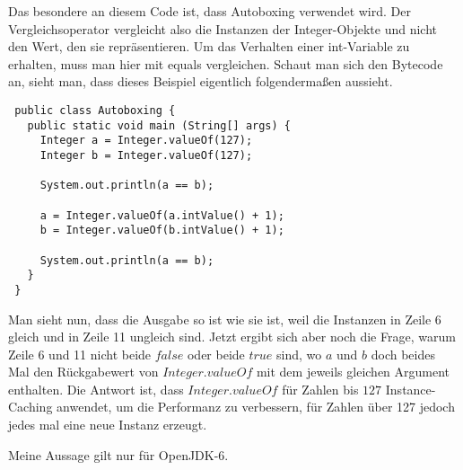\documentclass[a4paper,10pt]{article}
\begin{document}
Das besondere an diesem Code ist, dass Autoboxing verwendet wird.
Der Vergleichsoperator vergleicht also die Instanzen der Integer-Objekte und nicht den Wert, den sie repräsentieren.
Um das Verhalten einer int-Variable zu erhalten, muss man hier mit equals vergleichen.
Schaut man sich den Bytecode an, sieht man, dass dieses Beispiel eigentlich folgendermaßen aussieht.
\begin{lstlisting}
 public class Autoboxing {
   public static void main (String[] args) {
     Integer a = Integer.valueOf(127);
     Integer b = Integer.valueOf(127);

     System.out.println(a == b);

     a = Integer.valueOf(a.intValue() + 1);
     b = Integer.valueOf(b.intValue() + 1);

     System.out.println(a == b);
   }
 }
\end{lstlisting}
Man sieht nun, dass die Ausgabe so ist wie sie ist, weil die Instanzen in Zeile 6 gleich und in Zeile 11 ungleich sind.
Jetzt ergibt sich aber noch die Frage, warum Zeile 6 und 11 nicht beide $false$ oder beide $true$ sind, wo $a$ und $b$ doch beides Mal den Rückgabewert von $Integer.valueOf$ mit dem jeweils gleichen Argument enthalten.
Die Antwort ist, dass $Integer.valueOf$ für Zahlen bis $127$ Instance-Caching anwendet, um die Performanz zu verbessern, für Zahlen über 127 jedoch jedes mal eine neue Instanz erzeugt.

Meine Aussage gilt nur für OpenJDK-6.
\end{document}
